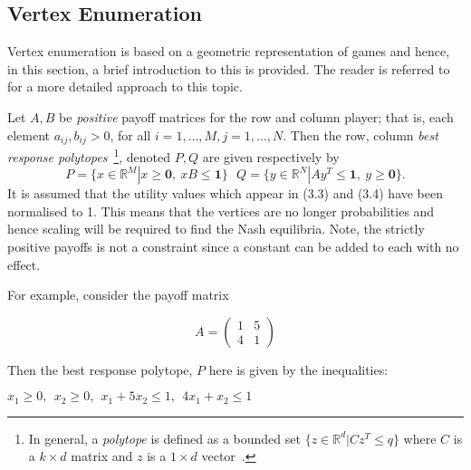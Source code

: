 \subsection{Vertex Enumeration}\label{subsec:Vertex_Enumeration}
Vertex enumeration is based on a geometric representation of games and hence,
in this section, a brief introduction to this is provided. The reader is
referred to~\cite{NoamNisan2007} for a more detailed approach to this topic.

\begin{definition}
    Let \(A, B\) be \emph{positive} payoff matrices for the row and column
    player; that is, each element \(a_{ij}, b_{ij} > 0\), for all \(i = 1,
    \ldots, M, j = 1, \ldots, N\). Then the row, column
    \textit{best response polytopes}~\footnote{In general, a
    \emph{polytope} is defined as a bounded set \( \{z \in \mathbb{R}^{d} |
    Cz^{T} \le q\} \) where \(C\) is a \(k \times d\) matrix and \(z\) is a \(1
    \times d\) vector~\cite{NoamNisan2007}.}, denoted \(P, Q\) are given respectively by
    \begin{equation}
        P = \{x \in \mathbb{R}^{M} | x \ge \textbf{0}, ~ xB \le \textbf{1}\} ~~~
        Q = \{y \in \mathbb{R}^{N} | Ay^{T} \le \textbf{1}, ~ y \ge \textbf{0}\}.
    \end{equation}
    It is assumed that the utility values which appear
    in (3.3) and (3.4) have been normalised
    to 1. This means that the vertices are no longer probabilities and hence
    scaling will be required to find the Nash equilibria. Note, the strictly
    positive payoffs is not a constraint since a constant can be added to each
    with no effect. 
\end{definition}\label{def:best_resp_polytopes}


For example, consider the payoff matrix 

\begin{equation}
    A = \begin{pmatrix}
        1 & 5 \\
        4 & 1
    \end{pmatrix}
\end{equation}\label{eqn:ex_vert_en}

Then the best response polytope, \(P\) here is given by the inequalities:
\begin{center}
    \(
        x_{1} \ge 0, ~~
        x_{2} \ge 0, ~~
        x_{1} + 5x_{2} \le 1, ~~
        4x_{1} + x_{2} \le 1
    \)
\end{center}

